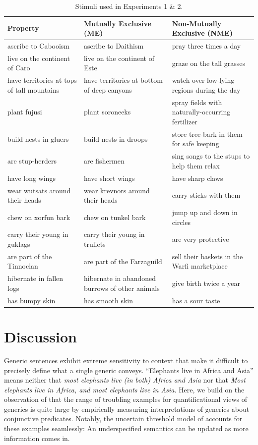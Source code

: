 \documentclass[10pt,letterpaper]{article}
\newcommand\Tstrut{\rule{0pt}{2.6ex}}       %
\newcommand\Bstrut{\rule[-1ex]{0pt}{0pt}} %
\newcommand{\TBstrut}{\Tstrut\Bstrut} %
\begin{document}
\begin{table}[!htb]
\small\addtolength{\tabcolsep}{-5pt}\renewcommand{\arraystretch}{1.1}
\begin{tabular*}{\textwidth}{p{5.5cm}p{6.5cm}p{6cm}}
\hline
Property & Mutually Exclusive (ME) & Non-Mutually Exclusive (NME) \TBstrut\\ \hline
ascribe to Cabooism & ascribe to Daithism & pray three times a day \Tstrut\\ 
live on the continent of Caro & live on the continent of Este & graze on the tall grasses \\ 
have territories at tops of tall mountains & have territories at bottom of deep canyons & watch over low-lying regions during the day \\ 
plant fujusi & plant soroneeks & spray fields with naturally-occurring fertilizer \\ 
build nests in gluers & build nests in droops & store tree-bark in them for safe keeping \\ 
are stup-herders & are fishermen & sing songs to the stups to help them relax \\ 
have long wings & have short wings & have sharp claws \\ 
wear wutsats around their heads & wear krevnors around their heads & carry sticks with them \\ 
chew on xorfun bark & chew on tunkel bark & jump up and down in circles \\ 
carry their young in guklags & carry their young in trullets & are very protective \\ 
are part of the Tinnoclan & are part of the Farzaguild & sell their baskets in the Warfi marketplace \\ 
hibernate in fallen logs & hibernate in abandoned burrows of other animals & give birth twice a year \\ 
has bumpy skin & has smooth skin & has a sour taste \Bstrut\\
\hline
\end{tabular*}
\caption{Stimuli used in Experiments 1 \& 2. }
\end{table}


\section{Discussion}

Generic sentences exhibit extreme sensitivity to context that make it difficult to precisely define what a single generic conveys. 
``Elephants live in Africa and Asia'' means neither that \emph{most elephants live (in both) Africa and Asia} nor that \emph{Most elephants live in Africa, and most elephants live in Asia}.
Here, we build on the observation of  that the range of troubling examples for quantificational views of generics is quite large by empirically measuring interpretations of generics about conjunctive predicates.  
Notably, the uncertain threshold model of  accounts for these examples seamlessly: An underspecified semantics can be updated as more information comes in. 
\end{document}

